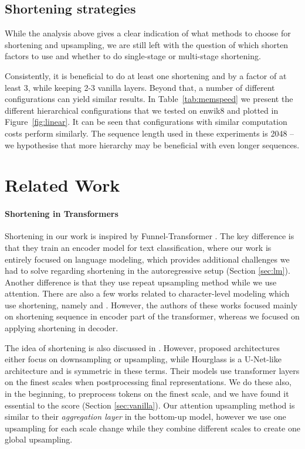 \documentclass[11pt]{article}
\begin{document}
\vspace{-6mm}
\subsection{Shortening strategies} \label{sec:sf}


While the analysis above gives a clear indication of what methods to choose for shortening and upsampling, we are still left with the question of which shorten factors to use and whether to do single-stage or multi-stage shortening. 

Consistently, it is beneficial to do at least one shortening and by a factor of at least 3, while keeping 2-3 vanilla layers. Beyond that, a number of different configurations can yield similar results. In Table~\ref{tab:memspeed} we present the different hierarchical configurations that we tested on enwik8 and plotted in Figure~\ref{fig:linear}. It can be seen that configurations with similar computation costs perform similarly. The sequence length used in these experiments is 2048 -- we hypothesise that more hierarchy may be beneficial with even longer sequences.

\bgroup
\setlength{\parskip}{0.0em}
\section{Related Work}
\paragraph{Shortening in Transformers} Shortening in our work is inspired by Funnel-Transformer \cite{dai2020funneltransformer}. The key difference is that they train an encoder model for text classification, where our work is entirely focused on language modeling, which provides additional challenges we had to solve regarding shortening in the autoregressive setup (Section \ref{sec:lm}). Another difference is that they use repeat upsampling method while we use attention. There are also a few works related to character-level modeling which use shortening, namely \cite{clark2021canine} and \cite{tay2021charformer}. However, the authors of these works focused mainly on shortening sequence in encoder part of the transformer, whereas we focused on applying shortening in decoder.

The idea of shortening is also discussed in \cite{subramanian2020multiscale}. However, proposed architectures either focus on downsampling or upsampling, while Hourglass is a U-Net-like architecture and is symmetric in these terms. Their models use transformer layers on the finest scales when postprocessing final representations. We do these also, in the beginning, to preprocess tokens on the finest scale, and we have found it essential to the score (Section \ref{sec:vanilla}). Our attention upsampling method is similar to their \emph{aggregation layer} in the bottom-up model, however we use one upsampling for each scale change while they combine different scales to create one global upsampling.
\end{document}
